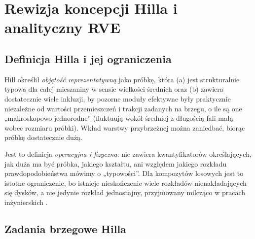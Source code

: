 \documentclass[12pt,a4paper,twoside,openright]{report}
\theoremstyle{definition}
\theoremstyle{remark}
\begin{document}
\chapter{Rewizja koncepcji Hilla i analityczny RVE}\label{sec:hill}

\section{Definicja Hilla i jej ograniczenia}

Hill \cite{hill1963elastic} określił \emph{objętość reprezentatywną} jako próbkę, która (a) jest strukturalnie typowa dla całej mieszaniny w sensie wielkości średnich oraz (b) zawiera dostatecznie wiele inkluzji, by pozorne moduły efektywne były praktycznie niezależne od wartości przemieszczeń i trakcji zadanych na brzegu, o ile są one „makroskopowo jednorodne” (fluktuują wokół średniej z długością fali małą wobec rozmiaru próbki). Wkład warstwy przybrzeżnej można zaniedbać, biorąc próbkę dostatecznie dużą.

Jest to definicja \emph{operacyjna i fizyczna}: nie zawiera kwantyfikatorów określających, jak duża ma być próbka, jakiego kształtu, ani względem jakiego rozkładu prawdopodobieństwa mówimy o „typowości”. Dla kompozytów losowych jest to istotne ograniczenie, bo istnieje nieskończenie wiele rozkładów nienakładających się dysków, a nie jedynie rozkład jednostajny, przyjmowany milcząco w pracach inżynierskich \cite{czapla2025computational,mityushev2025computationalpart3}.

\section{Zadania brzegowe Hilla}
\end{document}
